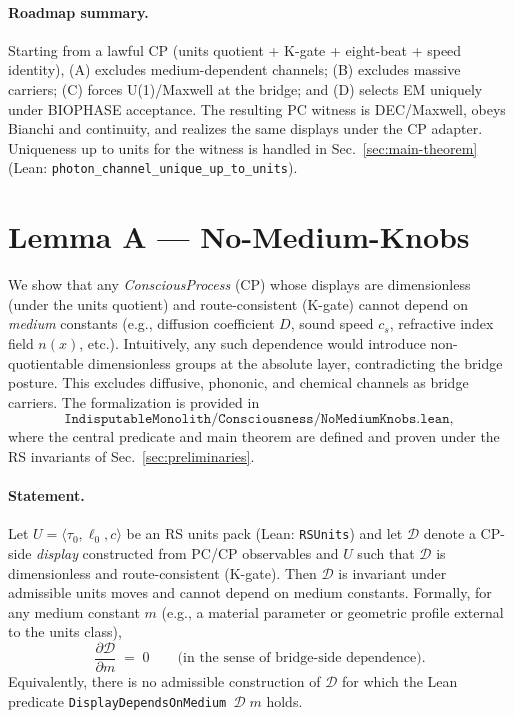 \documentclass[12pt,a4paper]{article}
\begin{document}
\paragraph{Roadmap summary.}
Starting from a lawful CP (units quotient + K-gate + eight-beat + speed identity), (A) excludes medium-dependent channels; (B) excludes massive carriers; (C) forces U(1)/Maxwell at the bridge; and (D) selects EM uniquely under BIOPHASE acceptance. The resulting PC witness is DEC/Maxwell, obeys Bianchi and continuity, and realizes the same displays under the CP adapter. Uniqueness up to units for the witness is handled in Sec.~\ref{sec:main-theorem} (Lean: \texttt{photon\_channel\_unique\_up\_to\_units}).

\section{Lemma A — No-Medium-Knobs}
\label{sec:lemmaA}

We show that any \emph{ConsciousProcess} (CP) whose displays are dimensionless (under the units quotient) and route-consistent (K-gate) cannot depend on \emph{medium} constants (e.g., diffusion coefficient \(D\), sound speed \(c_s\), refractive index field \(n(x)\), etc.). Intuitively, any such dependence would introduce non-quotientable dimensionless groups at the absolute layer, contradicting the bridge posture. This excludes diffusive, phononic, and chemical channels as bridge carriers. The formalization is provided in
\[
  \texttt{IndisputableMonolith/Consciousness/NoMediumKnobs.lean},
\]
where the central predicate and main theorem are defined and proven under the RS invariants of Sec.~\ref{sec:preliminaries}.

\paragraph{Statement.}
Let \(U=\langle \tau_0,\ell_0,c\rangle\) be an RS units pack (Lean: \texttt{RSUnits}) and let \(\mathcal{D}\) denote a CP-side \emph{display} constructed from PC/CP observables and \(U\) such that \(\mathcal{D}\) is dimensionless and route-consistent (K-gate). Then \(\mathcal{D}\) is invariant under admissible units moves and cannot depend on medium constants. Formally, for any medium constant \(m\) (e.g., a material parameter or geometric profile external to the units class),
\[
  \frac{\partial \mathcal{D}}{\partial m} \;=\; 0
  \qquad\text{(in the sense of bridge-side dependence)}.
\]
Equivalently, there is no admissible construction of \(\mathcal{D}\) for which the Lean predicate \texttt{DisplayDependsOnMedium \(\mathcal{D}\;m\)} holds.
\end{document}
